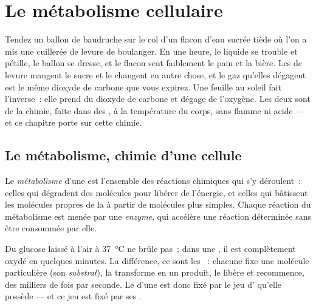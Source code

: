 \chapter{Le métabolisme cellulaire}\label{ch:g10:cell-metabolism}

Tendez un ballon de baudruche sur le col d'un flacon d'eau sucrée tiède
où l'on a mis une cuillerée de levure de boulanger. En une heure, le
liquide se trouble et pétille, le ballon se dresse, et le flacon sent
faiblement le pain et la bière. Les  de levure mangent le sucre
et le changent en autre chose, et le gaz qu'elles dégagent est le même
dioxyde de carbone que vous expirez. Une feuille au soleil fait
l'inverse~: elle prend du dioxyde de carbone et dégage de l'oxygène.
Les deux sont de la chimie, faite dans des , à la température
du corps, sans flamme ni acide --- et ce chapitre porte sur cette
chimie.

\section{Le métabolisme, chimie d'une cellule}

\begin{definition}[Métabolisme]\label{def:g10:cell-metabolism:metabolism}
Le \emph{métabolisme} d'une  est l'ensemble
des réactions chimiques qui s'y déroulent~: celles qui dégradent des
molécules pour libérer de l'énergie, et celles qui bâtissent les
molécules propres de la  à partir de molécules plus simples.
Chaque réaction du métabolisme est menée par une
\emph{enzyme},  qui accélère une réaction
déterminée sans être consommée par elle.
\end{definition}

\begin{proposition}\label{prop:g10:cell-metabolism:enzymes}
Du glucose laissé à l'air à \qty{37}{\celsius} ne brûle pas~; dans une
, il est complètement oxydé en quelques minutes. La différence,
ce sont les ~: chacune fixe une molécule particulière (son
\emph{substrat}), la transforme en un produit, le libère et recommence,
des milliers de fois par seconde. Le  d'une  est donc
fixé par le jeu d' qu'elle possède --- et ce jeu est fixé par
ses .
\end{proposition}
\admitted

